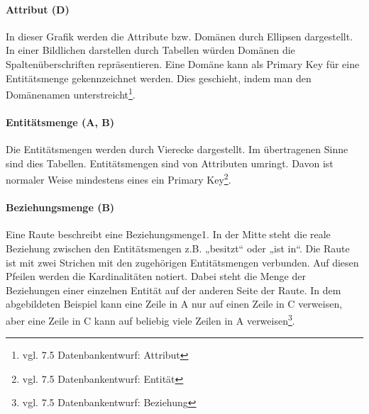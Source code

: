 \documentclass[a4paper, 12pt]{article}
\theoremstyle{plain}
\theoremstyle{definition}
\begin{document}
	\paragraph{Attribut (D)} In dieser Grafik werden die Attribute bzw. Domänen durch Ellipsen dargestellt. In einer Bildlichen darstellen durch Tabellen würden Domänen die Spaltenüberschriften repräsentieren. Eine Domäne kann als Primary Key für eine Entitätsmenge gekennzeichnet werden. Dies geschieht, indem man den Domänenamen unterstreicht\footnote{vgl. \cite{Jarosch2010} 7.5 Datenbankentwurf: Attribut}.
	
	\paragraph{Entitätsmenge (A, B)} Die Entitätsmengen werden durch Vierecke dargestellt. Im übertragenen Sinne sind dies Tabellen. Entitätsmengen sind von Attributen umringt. Davon ist normaler Weise mindestens eines ein Primary Key\footnote{vgl. \cite{Jarosch2010} 7.5 Datenbankentwurf: Entität}.
	
	\paragraph{Beziehungsmenge (B)} Eine Raute beschreibt eine Beziehungsmenge1. In der Mitte steht die reale Beziehung zwischen den Entitätsmengen z.B. „besitzt“ oder „ist in“. Die Raute ist mit zwei Strichen mit den zugehörigen Entitätsmengen verbunden.  Auf diesen Pfeilen werden die Kardinalitäten notiert. Dabei steht die Menge der Beziehungen einer einzelnen Entität auf der anderen Seite der Raute. In dem abgebildeten Beispiel kann eine Zeile in A nur auf einen Zeile in C verweisen, aber eine Zeile in C kann auf beliebig viele Zeilen in A verweisen\footnote{vgl. \cite{Jarosch2010} 7.5 Datenbankentwurf: Beziehung}. 
	
\end{document}
